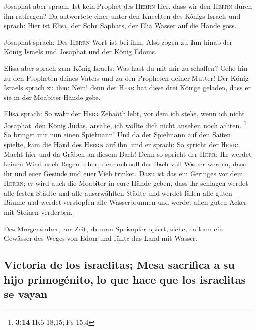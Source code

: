  Josaphat aber sprach: Ist kein Prophet des
\textsc{Herrn} hier, dass wir den \textsc{Herrn} durch ihn ratfragen? Da
antwortete einer unter den Knechten des Königs Israels und sprach: Hier
ist Elisa, der Sohn Saphats, der Elia Wasser auf die Hände goss.

 Josaphat sprach: Des \textsc{Herrn} Wort ist bei ihm.
Also zogen zu ihm hinab der König Israels und Josaphat und der König
Edoms.

 Elisa aber sprach zum König Israels: Was hast du mit mir
zu schaffen? Gehe hin zu den Propheten deines Vaters und zu den
Propheten deiner Mutter! Der König Israels sprach zu ihm: Nein! denn der
\textsc{Herr} hat diese drei Könige geladen, dass er sie in der Moabiter
Hände gebe.

 Elisa sprach: So wahr der \textsc{Herr} Zebaoth lebt,
vor dem ich stehe, wenn ich nicht Josaphat, den König Judas, ansähe, ich
wollte dich nicht ansehen noch achten. \footnote{\textbf{3:14} 1Kö
  18,15; Ps 15,4}  So bringet mir nun einen Spielmann!
Und da der Spielmann auf den Saiten spielte, kam die Hand des
\textsc{Herrn} auf ihn,  und er sprach: So spricht der
\textsc{Herr}: Macht hier und da Gräben an diesem Bach! 
Denn so spricht der \textsc{Herr}: Ihr werdet keinen Wind noch Regen
sehen; dennoch soll der Bach voll Wasser werden, dass ihr und euer
Gesinde und euer Vieh trinket.  Dazu ist das ein Geringes
vor dem \textsc{Herrn}; er wird auch die Moabiter in eure Hände geben,
 dass ihr schlagen werdet alle festen Städte und alle
auserwählten Städte und werdet fällen alle guten Bäume und werdet
verstopfen alle Wasserbrunnen und werdet allen guten Acker mit Steinen
verderben.

 Des Morgens aber, zur Zeit, da man Speisopfer opfert,
siehe, da kam ein Gewässer des Weges von Edom und füllte das Land mit
Wasser.

\hypertarget{victoria-de-los-israelitas-mesa-sacrifica-a-su-hijo-primoguxe9nito-lo-que-hace-que-los-israelitas-se-vayan}{%
\subsection{Victoria de los israelitas; Mesa sacrifica a su hijo
primogénito, lo que hace que los israelitas se
vayan}\label{victoria-de-los-israelitas-mesa-sacrifica-a-su-hijo-primoguxe9nito-lo-que-hace-que-los-israelitas-se-vayan}}

